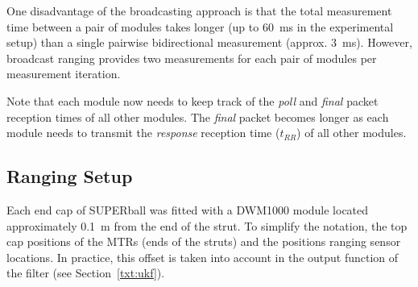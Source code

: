 One disadvantage of the broadcasting approach is that the total measurement time between a pair of modules takes longer (up to \SI{60}{\milli\second} in the experimental setup)
 than a single pairwise bidirectional measurement (approx. \SI{3}{\milli\second}).
However, broadcast ranging provides two measurements for each pair of modules per measurement iteration.

Note that each module now needs to keep track of the \emph{poll} and \emph{final} packet reception times of all other modules.
The \emph{final} packet becomes longer as each module needs to transmit the \emph{response} reception time ($t_{RR}$)  of all other modules.


{%






\subsection{Ranging Setup}
Each end cap of SUPERball was fitted with a DWM1000 module located approximately \SI{0.1}{\metre} from the end of the strut.
To simplify the notation, the top cap positions of the MTRs (ends of the struts) and the positions ranging sensor locations.
In practice, this offset is taken into account in the output function of the filter (see Section~\ref{txt:ukf}).

}
